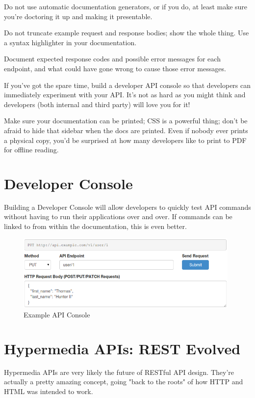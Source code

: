 \documentclass{book}
\begin{document}
Do not use automatic documentation generators, or if you do, at least make sure you're doctoring it up and making it presentable.

Do not truncate example request and response bodies; show the whole thing. Use a syntax highlighter in your documentation.

Document expected response codes and possible error messages for each endpoint, and what could have gone wrong to cause those error messages.

If you've got the spare time, build a developer API console so that developers can immediately experiment with your API. It's not as hard as you might think and developers (both internal and third party) will love you for it!

Make sure your documentation can be printed; CSS is a powerful thing; don't be afraid to hide that sidebar when the docs are printed. Even if nobody ever prints a physical copy, you'd be surprised at how many developers like to print to PDF for offline reading.


\chapter{Developer Console}

Building a Developer Console will allow developers to quickly test API commands without having to run their applications over and over. If commands can be linked to from within the documentation, this is even better.

\begin{figure}[ht!]
\centering
\includegraphics[width=110mm]{images/api-console.png}
\caption{Example API Console}
\label{overflow}
\end{figure}


\chapter{Hypermedia APIs: REST Evolved}

Hypermedia APIs are very likely the future of RESTful API design. They're actually a pretty amazing concept, going "back to the roots" of how HTTP and HTML was intended to work.
\end{document}
